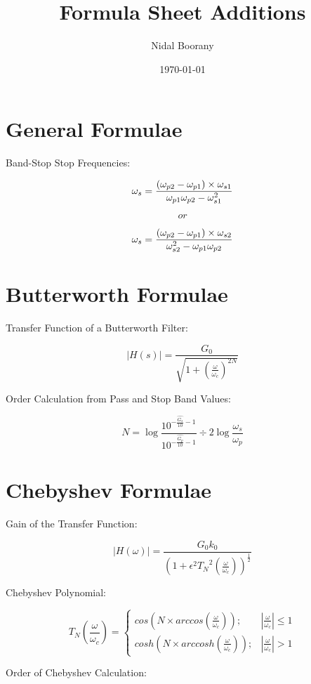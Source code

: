 \documentclass{article}
\begin{document}
\title{Formula Sheet Additions}
\author{Nidal Boorany}
\date{\today}
\maketitle

\section{General Formulae}

Band-Stop Stop Frequencies:

$$\omega_{s} = \frac{(\omega_{p2} - \omega_{p1})\times \omega_{s1}}{\omega_{p1}\omega_{p2}-\omega_{s1}^2} \space$$

$$or$$

$$\omega_{s} = \frac{(\omega_{p2} - \omega_{p1})\times \omega_{s2}}{\omega_{s2}^2-\omega_{p1}\omega_{p2}} \space$$

\section{Butterworth Formulae}
Transfer Function of a Butterworth Filter:

$$|H(s)| = \frac{G_0}{\sqrt{1 + (\frac{\omega}{\omega_c})^{2N}}}$$

Order Calculation from Pass and Stop Band Values:

$$N = \log{\frac{10^{- \frac{\hat{G_s}}{10} - 1}}{10^{- \frac{\hat{G_p}}{ 10} - 1}}} \div {2 \log{\frac{\omega_s}{\omega_p}}}$$

\section{Chebyshev Formulae}

Gain of the Transfer Function:

$$|H(\omega)| = \frac{{G_0} {k_0}}{(1 + {\epsilon}^2 {T_N}^2(\frac{\omega}{\omega_c}))^{\frac{1}{2}}}$$

Chebyshev Polynomial:

$$T_N (\frac{\omega}{\omega_c}) = 
\begin{cases} 
cos(N \times arccos(\frac{\omega}{\omega_c})); & |\frac{\omega}{\omega_c}| \leqslant 1 \\
cosh(N \times arccosh(\frac{\omega}{\omega_c})); & |\frac{\omega}{\omega_c}| > 1
\end{cases}$$

Order of Chebyshev Calculation:
\end{document}
